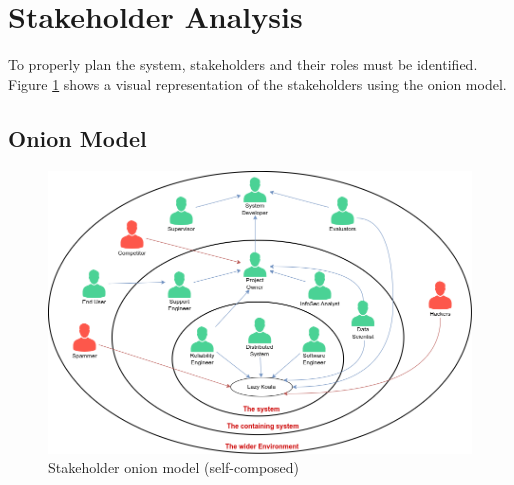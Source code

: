 \section{Stakeholder Analysis}

To properly plan the system, stakeholders and their roles must be identified. Figure \ref{fig:stakeholder-onion} shows a visual representation of the stakeholders using the onion model.

\subsection{Onion Model}

\begin{figure}[H]
    \includegraphics[width=15cm]{assets/requirement-specification/onion-model.png}
    \caption{Stakeholder onion model (self-composed)}
    \label{fig:stakeholder-onion}
\end{figure}



